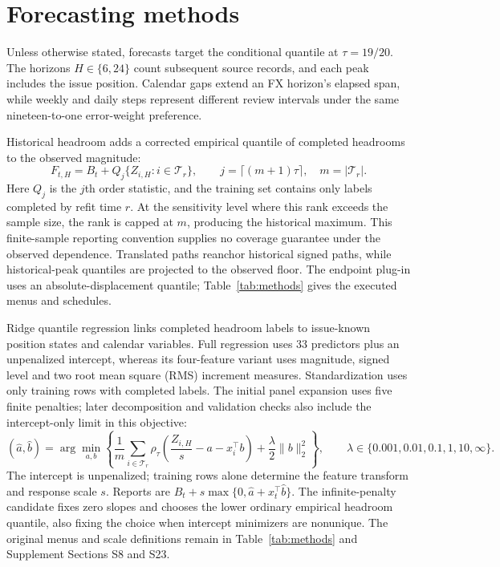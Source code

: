 \documentclass[11pt,a4paper]{article}
\begin{document}


\FloatBarrier

\section{Forecasting methods}\label{sec:methods}

Unless otherwise stated, forecasts target the conditional quantile at \(\tau=19/20\). The horizons \(H\in\{6,24\}\) count subsequent source records, and each peak includes the issue position. Calendar gaps extend an FX horizon's elapsed span, while weekly and daily steps represent different review intervals under the same nineteen-to-one error-weight preference.

Historical headroom adds a corrected empirical quantile of completed headrooms to the observed magnitude:
\[
F_{t,H}=B_t+Q_j\{Z_{i,H}:i\in\mathcal T_r\},\qquad
j=\lceil(m+1)\tau\rceil,\quad m=|\mathcal T_r|.
\]
Here \(Q_j\) is the \(j\)th order statistic, and the training set contains only labels completed by refit time \(r\).
At the sensitivity level where this rank exceeds the sample size, the rank is capped at \(m\), producing the historical maximum.
This finite-sample reporting convention supplies no coverage guarantee under the observed dependence. Translated paths reanchor historical signed paths, while historical-peak quantiles are projected to the observed floor. The endpoint plug-in uses an absolute-displacement quantile; Table~\ref{tab:methods} gives the executed menus and schedules.

Ridge quantile regression links completed headroom labels to issue-known position states and calendar variables. Full regression uses 33 predictors plus an unpenalized intercept, whereas its four-feature variant uses magnitude, signed level and two root mean square (RMS) increment measures. Standardization uses only training rows with completed labels. The initial panel expansion uses five finite penalties; later decomposition and validation checks also include the intercept-only limit in this objective:
\[
(\hat a,\hat b)=\arg\min_{a,b}\left\{
\frac1m\sum_{i\in\mathcal T_r}\rho_\tau\!\left(\frac{Z_{i,H}}s-a-x_i^\top b\right)
+\frac\lambda2\|b\|_2^2\right\},\qquad
\lambda\in\{0.001,0.01,0.1,1,10,\infty\}.
\]
The intercept is unpenalized; training rows alone determine the feature transform and response scale \(s\).
Reports are \(B_t+s\max\{0,\hat a+x_t^\top\hat b\}\). The infinite-penalty candidate fixes zero slopes and chooses the lower ordinary empirical headroom quantile, also fixing the choice when intercept minimizers are nonunique.
The original menus and scale definitions remain in Table~\ref{tab:methods} and Supplement Sections S8 and S23.
\end{document}
